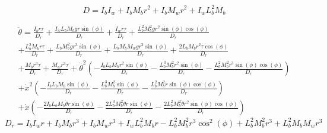 \documentclass[12pt]{article}
\begin{document}
\[
D = I_{b} I_{w} + I_{b} M_{b} r^{2} + I_{b} M_{w} r^{2} + I_{w} L_{b}^{2} M_{b}
\]

\begin{multline*}
\ddot{\theta} = 
\frac{I_{b} r \tau}{D_r} 
+ \frac{I_{w} L_{b} M_{b} g r \sin{\left(\phi \right)}}{D_r} 
+ \frac{I_{w} r \tau}{D_r} 
+ \frac{L_{b}^{2} M_{b}^{2} g r^{2} \sin{\left(\phi \right)} \cos{\left(\phi \right)}}{D_r} 
\\
+ \frac{L_{b}^{2} M_{b} r \tau}{D_r} 
+ \frac{L_{b} M_{b}^{2} g r^{3} \sin{\left(\phi \right)}}{D_r} 
+ \frac{L_{b} M_{b} M_{w} g r^{3} \sin{\left(\phi \right)}}{D_r} 
+ \frac{2 L_{b} M_{b} r^{2} \tau \cos{\left(\phi \right)}}{D_r} 
\\
+ \frac{M_{b} r^{3} \tau}{D_r} 
+ \frac{M_{w} r^{3} \tau}{D_r} 
+ \dot{\theta}^{2} \left(
    - \frac{I_{b} L_{b} M_{b} r^{2} \sin{\left(\phi \right)}}{D_r} 
    - \frac{L_{b}^{3} M_{b}^{2} r^{2} \sin{\left(\phi \right)}}{D_r} 
    - \frac{L_{b}^{2} M_{b}^{2} r^{3} \sin{\left(\phi \right)} \cos{\left(\phi \right)}}{D_r}
\right) 
\\
+ \dot{x}^{2} \left(
    - \frac{I_{b} L_{b} M_{b} \sin{\left(\phi \right)}}{D_r} 
    - \frac{L_{b}^{3} M_{b}^{2} \sin{\left(\phi \right)}}{D_r} 
    - \frac{L_{b}^{2} M_{b}^{2} r \sin{\left(\phi \right)} \cos{\left(\phi \right)}}{D_r}
\right) 
\\
+ \dot{x} \left(
    - \frac{2 I_{b} L_{b} M_{b} \dot{\theta} r \sin{\left(\phi \right)}}{D_r} 
    - \frac{2 L_{b}^{3} M_{b}^{2} \dot{\theta} r \sin{\left(\phi \right)}}{D_r} 
    - \frac{2 L_{b}^{2} M_{b}^{2} \dot{\theta} r^{2} \sin{\left(\phi \right)} \cos{\left(\phi \right)}}{D_r}
\right)
\end{multline*}
\[
D_r=I_{b} I_{w} r + I_{b} M_{b} r^{3} + I_{b} M_{w} r^{3} + I_{w} L_{b}^{2} M_{b} r - L_{b}^{2} M_{b}^{2} r^{3} \cos^{2}{\left(\phi \right)} + L_{b}^{2} M_{b}^{2} r^{3} + L_{b}^{2} M_{b} M_{w} r^{3}
\]
\end{document}
